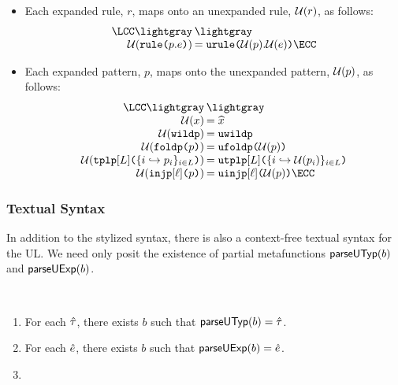 \begin{grayparbox}
\begin{itemize}
\item Each expanded rule, $r$, maps onto an unexpanded rule, $\mathcal{U}(r)$, as follows:
\[\arraycolsep=1pt\begin{array}{rl}
\LCC \lightgray & \lightgray \\
\Uof{\aematchrule{p}{e}} & = \aumatchrule{\Uof{p}}{\Uof{e}}\ECC
\end{array}\]
\item Each expanded pattern, $p$, maps onto the unexpanded pattern, $\mathcal{U}(p)$, as follows:
\[\arraycolsep=1pt\begin{array}{rl}
\LCC \lightgray & \lightgray \\
\Uof{x} & = \sigilof{x}\\
\Uof{\aewildp} &= \auwildp\\
\Uof{\aefoldp{p}} &= \aufoldp{\Uof{p}}\\
\Uof{\aetplp{\labelset}{\mapschema{p}{i}{\labelset}}} & = \autplp{\labelset}{\mapschemax{\Uofv}{p}{i}{\labelset}}\\
\Uof{\aeinjp{\ell}{p}} & = \auinjp{\ell}{\Uof{p}}\ECC
\end{array}\]
\end{itemize}
\end{grayparbox}
\vspace{-10px}
\subsubsection{Textual Syntax}\vspace{-3px} In addition to the stylized syntax, there is also a context-free textual syntax for the UL. We need only posit the existence of partial metafunctions $\mathsf{parseUTyp}(b)$ and $\mathsf{parseUExp}(b)$. 

\begin{condition}\label{condition:textual-representability-SES} ~
\begin{enumerate}
\item For each ${\hat\tau}$, there exists $b$ such that $\mathsf{parseUTyp}(b)={\hat\tau}$. 
\item For each ${\hat e}$, there exists $b$ such that $\mathsf{parseUExp}(b)={\hat e}$.
\item {}
\end{enumerate}
\end{condition}

